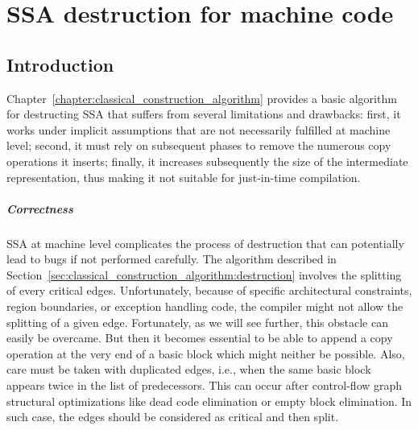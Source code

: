 \chapter{SSA destruction for machine code }


\label{chapter:alternative_ssa_destruction_algorithm}


\section{Introduction}
Chapter~\ref{chapter:classical_construction_algorithm} provides a basic algorithm for destructing SSA that suffers from several limitations and drawbacks: 
first, it works under implicit assumptions that are not necessarily fulfilled at machine level; 
second, it must rely on subsequent phases to remove the numerous copy operations it inserts; 
finally, it increases subsequently the size of the intermediate representation, thus making it not suitable for just-in-time compilation.

\paragraph{Correctness}
SSA at machine level complicates the process of destruction that can potentially lead to bugs if not performed carefully. 
The algorithm described in Section~\ref{sec:classical_construction_algorithm:destruction} involves the splitting of every critical edges. 
Unfortunately, because of specific architectural constraints, region boundaries, or exception handling code, the compiler might not allow the splitting of a given edge. 
Fortunately, as we will see further, this obstacle can easily be overcame. 
But then it becomes essential to be able to append a copy operation at the very end of a basic block which might neither be possible. 
Also, care must be taken with duplicated edges, i.e., when the same basic block appears twice in the list of predecessors. 
This can occur after control-flow graph structural optimizations like dead code elimination or empty block elimination. 
In such case, the edges should be considered as critical and then split.

